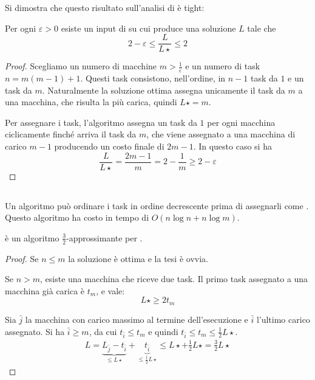Si dimostra che questo risultato sull'analisi di \GreedyLoadBalancing è tight:
\begin{theorem}
	Per ogni $\varepsilon>0$ esiste un input di \LoadBalancing su cui \GreedyLoadBalancing produce una soluzione $L$ tale che
	\begin{equation*}
		2-\varepsilon\leq\frac L{L\star}\leq2
	\end{equation*}
\end{theorem}
\begin{proof}
	Scegliamo un numero di macchine $m>\frac1\varepsilon$ e un numero di task $n=m(m-1)+1$. Questi task consistono, nell'ordine, in $n-1$ task da $1$ e un task da $m$. Naturalmente la soluzione ottima assegna unicamente il task da $m$ a una macchina, che risulta la più carica, quindi $L\star=m$.

	Per assegnare i task, l'algoritmo assegna un task da $1$ per ogni macchina ciclicamente finché arriva il task da $m$, che viene assegnato a una macchina di carico $m-1$ producendo un costo finale di $2m-1$. In questo caso si ha
	\begin{equation*}
		\frac L{L\star}=\frac{2m-1}{m}=2-\frac1m\geq2-\varepsilon
	\end{equation*}
\end{proof}


\subsection{\SortedGreedyBalance}
Un algoritmo \SortedGreedyBalance può ordinare i task in ordine decrescente prima di assegnarli come \GreedyLoadBalancing. Questo algoritmo ha costo in tempo di $O(n\log n+n\log m)$.

\begin{theorem}
	\SortedGreedyBalance è un algoritmo $\frac32$-approssimante per \LoadBalancing.
\end{theorem}
\begin{proof}
	Se $n\leq m$ la soluzione è ottima e la tesi è ovvia.

	Se $n>m$, esiste una macchina che riceve due task. Il primo task assegnato a una macchina già carica è $t_m$, e vale:
	\begin{equation*}
		L\star\geq 2t_m
	\end{equation*}

	Sia $\bar j$ la macchina con carico massimo al termine dell'esecuzione e $\bar i$ l'ultimo carico assegnato. Si ha $\bar i \geq m$, da cui $t_{\bar i}\leq t_m$ e quindi $t_{\bar i}\leq t_m\leq \frac12 L\star$.
	\begin{gather*}
		L=\underbrace{L_{\bar j}-t_{\bar i}}_{\leq L\star}+\underbrace{t_{\bar i} }_{\leq \frac12 L\star}\leq L\star+\frac12 L\star=\frac32L\star
	\end{gather*}
\end{proof}

